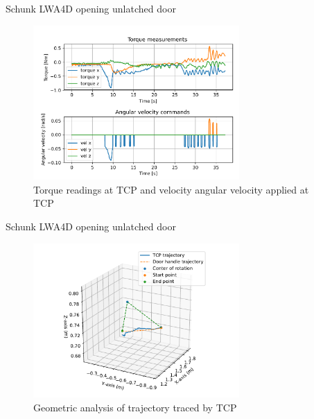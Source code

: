 \documentclass[aspectratio=169]{beamer}
\begin{document}
\begin{frame}
	Schunk LWA4D opening unlatched door
	\vspace{-0.4cm}
	\begin{figure}[t]
		\centering
		\includegraphics[width=0.7\textwidth]{images/exp/t-wn.pdf}
		\vspace{-0.3cm}
		\caption{Torque readings at TCP and velocity angular velocity applied at TCP}
		\label{EX:t-w}
	\end{figure}
\end{frame}

\begin{frame}
	Schunk LWA4D opening unlatched door
	\vspace{-0.3cm}
	\begin{figure}[t]
		\centering
		\includegraphics[width=0.7\textwidth]{images/exp/traj.pdf}
			\vspace{-0.3cm}
		\caption{Geometric analysis of trajectory traced by TCP}
		\label{EX:traj}
	\end{figure}
\end{frame}
\end{document}
